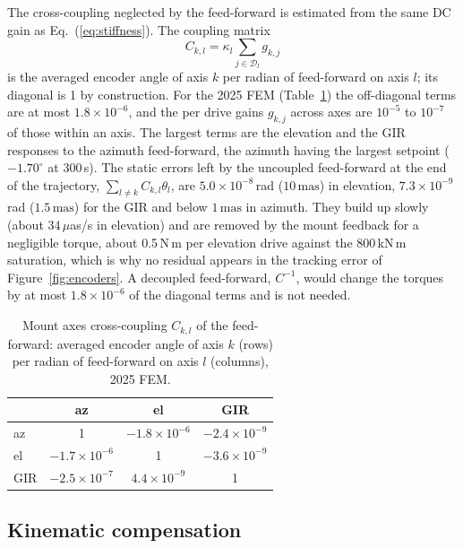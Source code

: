 \documentclass{gmto}
\numberwithin{table}{section}
\numberwithin{equation}{section}
\newcommand{\mas}{\,\mathrm{mas}}
\begin{document}
The cross-coupling neglected by the feed-forward is estimated from the same DC gain as
Eq.~(\ref{eq:stiffness}). The coupling matrix
\begin{equation}
  C_{k,l} = \kappa_l \sum_{j\in\mathcal{D}_l} g_{k,j}
\end{equation}
is the averaged encoder angle of axis $k$ per radian of feed-forward on axis $l$; its diagonal is 1 by
construction. For the 2025 FEM (Table~\ref{tab:coupling}) the off-diagonal terms are at most
$1.8\times10^{-6}$, and the per drive gains $g_{k,j}$ across axes are $10^{-5}$ to $10^{-7}$ of those within
an axis. The largest terms are the elevation and the GIR responses to the azimuth feed-forward, the
azimuth having the largest setpoint ($-1.70^\circ$ at 300\,s). The static errors left by the uncoupled
feed-forward at the end of the trajectory, $\sum_{l\neq k} C_{k,l}\theta_l$, are
$5.0\times10^{-8}$\,rad ($10\mas$) in elevation, $7.3\times10^{-9}$\,rad ($1.5\mas$) for the GIR and below
$1\mas$ in azimuth. They build up slowly (about $34\,\mu$as/s in elevation) and are removed by the mount
feedback for a negligible torque, about 0.5\,N\,m per elevation drive against the 800\,kN\,m saturation,
which is why no residual appears in the tracking error of Figure~\ref{fig:encoders}.
A decoupled feed-forward, $C^{-1}$, would change the torques by at most $1.8\times10^{-6}$ of the diagonal
terms and is not needed.

\begin{table}[htbp]
  \centering
  \caption{Mount axes cross-coupling $C_{k,l}$ of the feed-forward: averaged encoder angle of axis $k$
    (rows) per radian of feed-forward on axis $l$ (columns), 2025 FEM.}
  \label{tab:coupling}
  \begin{tabular}{lccc}
    \toprule
         & az                    & el                    & GIR \\
    \midrule
    az   & 1                     & $-1.8\times10^{-6}$   & $-2.4\times10^{-9}$ \\
    el   & $-1.7\times10^{-6}$   & 1                     & $-3.6\times10^{-9}$ \\
    GIR  & $-2.5\times10^{-7}$   & $4.4\times10^{-9}$    & 1 \\
    \bottomrule
  \end{tabular}
\end{table}

\subsection{Kinematic compensation}
\label{sec:ver-kin}
\end{document}
